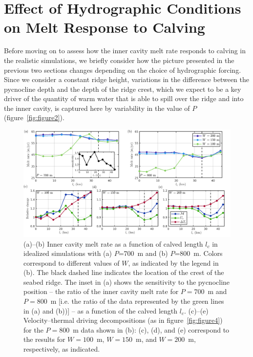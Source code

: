 \documentclass[draft]{agujournal2019}
\begin{document}
\section{Effect of Hydrographic Conditions on Melt Response to Calving}\label{S:Results:P}
Before moving on to assess how the inner cavity melt rate responds to calving in the realistic simulations, we briefly consider how the picture presented in the previous two sections changes depending on the choice of hydrographic forcing. Since we consider a constant ridge height, variations in the difference between the pycnocline depth and the depth of the ridge crest, which we expect to be a key driver of the quantity of warm water that is able to spill over the ridge and into the inner cavity, is captured here by variability in the value of $P$ (figure~\ref{fig:figure2}).

\begin{figure}
    \centering
    \includegraphics[width = \textwidth]{plots/figure8.png}
    \caption{(a)--(b) Inner cavity melt rate as a function of calved length $l_c$ in idealized simulations with (a) $P$=700~m and (b) $P$=800~m. Colors correspond to different values of $W$, as indicated by the legend in (b). The black dashed line indicates the location of the crest of the seabed ridge. The inset in (a) shows the sensitivity to the pycnocline position -- the ratio of the inner cavity melt rate for $P = 700$~m and $P = 800$~m [i.e. the ratio of the data represented by the green lines in (a) and (b))] -- as a function of the calved length $l_c$. (c)--(e) Velocity--thermal driving decompositions (as in figure~\ref{fig:figure4}) for the $P = 800$~m data shown in (b): (c), (d), and (e) correspond to the results for $W=100$~m, $W=150$~m, and $W=200$~m, respectively, as indicated.}
    \label{fig:figure8}
\end{figure}
\end{document}
